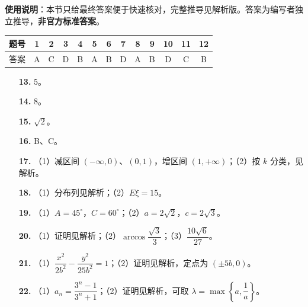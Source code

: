 
\begin{gknotice}
\textbf{使用说明}：本节只给最终答案便于快速核对，完整推导见解析版。答案为编写者独立推导，\textbf{非官方标准答案}。
\end{gknotice}

\begin{center}\begin{tabular}{ccccccccccccc}
\toprule
题号 & 1 & 2 & 3 & 4 & 5 & 6 & 7 & 8 & 9 & 10 & 11 & 12 \\
\midrule
答案 & A & C & D & B & A & B & D & A & B & D & C & B \\
\bottomrule
\end{tabular}\end{center}

\begin{itemize}[leftmargin=2.6em]
  \item[\textbf{13.}] $5$。
  \item[\textbf{14.}] $8$。
  \item[\textbf{15.}] $\sqrt2$。
  \item[\textbf{16.}] B、C。
\end{itemize}

\begin{itemize}[leftmargin=2.6em]
  \item[\textbf{17.}] （1）减区间 $(-\infty,0)$、$(0,1)$，增区间 $(1,+\infty)$；（2）按 $k$ 分类，见解析。
  \item[\textbf{18.}] （1）分布列见解析；（2）$E\xi=15$。
  \item[\textbf{19.}] （1）$A=45^\circ$，$C=60^\circ$；（2）$a=2\sqrt2$，$c=2\sqrt3$。
  \item[\textbf{20.}] （1）证明见解析；（2）$\arccos\dfrac{\sqrt3}{3}$；（3）$\dfrac{10\sqrt6}{27}$。
  \item[\textbf{21.}] （1）$\dfrac{x^2}{2b^2}-\dfrac{y^2}{25b^2}=1$；（2）证明见解析，定点为 $(\pm5b,0)$。
  \item[\textbf{22.}] （1）$a_n=\dfrac{3^n-1}{3^n+1}$；（2）证明见解析，可取 $\lambda=\max\left\{a,\dfrac1a\right\}$。
\end{itemize}
